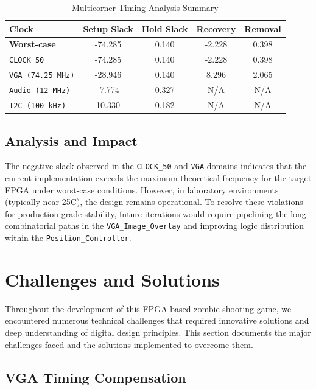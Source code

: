 \documentclass[12pt,a4paper]{article}
\begin{document}
\begin{table}[h]
\centering
\caption{Multicorner Timing Analysis Summary}
\label{tab:multicorner}
\begin{tabular}{|l|c|c|c|c|}
\hline
\textbf{Clock} & \textbf{Setup Slack} & \textbf{Hold Slack} & \textbf{Recovery} & \textbf{Removal} \\ \hline
\textbf{Worst-case} & -74.285 & 0.140 & -2.228 & 0.398 \\ \hline
\texttt{CLOCK\_50} & -74.285 & 0.140 & -2.228 & 0.398 \\ \hline
\texttt{VGA (74.25 MHz)} & -28.946 & 0.140 & 8.296 & 2.065 \\ \hline
\texttt{Audio (12 MHz)} & -7.774 & 0.327 & N/A & N/A \\ \hline
\texttt{I2C (100 kHz)} & 10.330 & 0.182 & N/A & N/A \\ \hline
\end{tabular}
\end{table}

\subsection{Analysis and Impact}
The negative slack observed in the \texttt{CLOCK\_50} and \texttt{VGA} domains indicates that the current implementation exceeds the maximum theoretical frequency for the target FPGA under worst-case conditions. However, in laboratory environments (typically near 25C), the design remains operational. To resolve these violations for production-grade stability, future iterations would require pipelining the long combinatorial paths in the \texttt{VGA\_Image\_Overlay} and improving logic distribution within the \texttt{Position\_Controller}.

\section{Challenges and Solutions}

Throughout the development of this FPGA-based zombie shooting game, we encountered numerous technical challenges that required innovative solutions and deep understanding of digital design principles. This section documents the major challenges faced and the solutions implemented to overcome them.

\subsection{VGA Timing Compensation}
\end{document}
